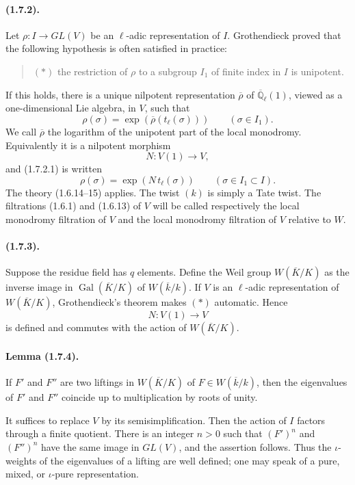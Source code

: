 \documentclass[11pt]{article}
\theoremstyle{remark}
\newcommand{\Gal}{\operatorname{Gal}}
\begin{document}
\paragraph{(1.7.2).} Let $\rho:I\to GL(V)$ be an $\ell$-adic representation of $I$. Grothendieck proved that the following hypothesis is often satisfied in practice:
\begin{quote}
$(*)$ the restriction of $\rho$ to a subgroup $I_1$ of finite index in $I$ is unipotent.
\end{quote}
If this holds, there is a unique nilpotent representation $\overline\rho$ of $\overline{\mathbb Q}_\ell(1)$, viewed as a one-dimensional Lie algebra, in $V$, such that
\begin{equation}\tag{1.7.2.1}
        \rho(\sigma)=\exp(\overline\rho(t_\ell(\sigma)))\qquad(\sigma\in I_1).
\end{equation}
We call $\overline\rho$ the logarithm of the unipotent part of the local monodromy. Equivalently it is a nilpotent morphism
\[
        N:V(1)\longrightarrow V,
\]
and (1.7.2.1) is written
\begin{equation}\tag{1.7.2.2}
        \rho(\sigma)=\exp(N\,t_\ell(\sigma))\qquad(\sigma\in I_1\subset I).
\end{equation}
The theory (1.6.14--15) applies. The twist $(k)$ is simply a Tate twist. The filtrations (1.6.1) and (1.6.13) of $V$ will be called respectively the local monodromy filtration of $V$ and the local monodromy filtration of $V$ relative to $W$.

\paragraph{(1.7.3).} Suppose the residue field has $q$ elements. Define the Weil group $W(\overline K/K)$ as the inverse image in $\Gal(\overline K/K)$ of $W(\overline k/k)$. If $V$ is an $\ell$-adic representation of $W(\overline K/K)$, Grothendieck's theorem makes $(*)$ automatic. Hence
\[
        N:V(1)\longrightarrow V
\]
is defined and commutes with the action of $W(\overline K/K)$.

\paragraph{Lemma (1.7.4).} If $F'$ and $F''$ are two liftings in $W(\overline K/K)$ of $F\in W(\overline k/k)$, then the eigenvalues of $F'$ and $F''$ coincide up to multiplication by roots of unity.

It suffices to replace $V$ by its semisimplification. Then the action of $I$ factors through a finite quotient. There is an integer $n>0$ such that $(F')^n$ and $(F'')^n$ have the same image in $GL(V)$, and the assertion follows. Thus the $\iota$-weights of the eigenvalues of a lifting are well defined; one may speak of a pure, mixed, or $\iota$-pure representation.
\end{document}
